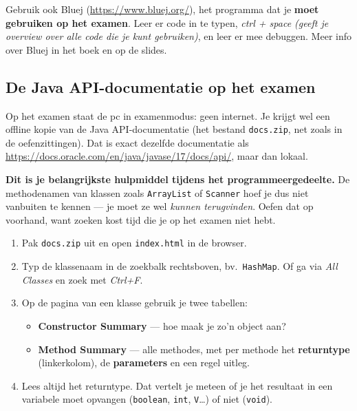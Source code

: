 \documentclass[a4paper,11pt]{article}
\begin{document}
Gebruik ook Bluej (\url{https://www.bluej.org/}), het programma dat je \textbf{moet gebruiken op het examen}. Leer er code in te typen, \textit{ctrl + space (geeft je overview
    over alle code die je kunt gebruiken)}, en leer er mee debuggen. Meer info over Bluej in het boek en op de slides.


\subsection{De Java API-documentatie op het examen}
\label{sec:oop-javadocs}

Op het examen staat de pc in examenmodus: geen internet. Je krijgt wel een
offline kopie van de Java API-documentatie (het bestand \texttt{docs.zip}, net
zoals in de oefenzittingen). Dat is exact dezelfde documentatie als
\url{https://docs.oracle.com/en/java/javase/17/docs/api/}, maar dan lokaal.

\textbf{Dit is je belangrijkste hulpmiddel tijdens het programmeergedeelte.}
De methodenamen van klassen zoals \texttt{ArrayList} of \texttt{Scanner} hoef je
dus niet vanbuiten te kennen --- je moet ze wel \emph{kunnen terugvinden}. Oefen
dat op voorhand, want zoeken kost tijd die je op het examen niet hebt.

\begin{enumerate}
    \item Pak \texttt{docs.zip} uit en open \texttt{index.html} in de browser.
    \item Typ de klassenaam in de zoekbalk rechtsboven, bv.\ \texttt{HashMap}.
          Of ga via \textit{All Classes} en zoek met \textit{Ctrl+F}.
    \item Op de pagina van een klasse gebruik je twee tabellen:
          \begin{itemize}
              \item \textbf{Constructor Summary} --- hoe maak je zo'n object aan?
              \item \textbf{Method Summary} --- alle methodes, met per methode het
                    \textbf{returntype} (linkerkolom), de \textbf{parameters} en een
                    regel uitleg.
          \end{itemize}
    \item Lees altijd het returntype. Dat vertelt je meteen of je het resultaat
          in een variabele moet opvangen (\texttt{boolean}, \texttt{int},
          \texttt{V}\dots) of niet (\texttt{void}).
\end{enumerate}
\end{document}
